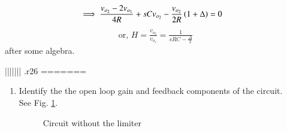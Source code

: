 \begin{enumerate}[label=\arabic*.,ref=\theenumi]
\begin{align}
\implies \frac{v_{o_2} - 2v_{o_1}}{4R} + sCv_{o_2} -  \frac{v_{o_2}}{2R}\left(1 + \Delta\right) &= 0
\end{align}
\begin{align}
\text{or, }    H = \frac{v_{o_2}}{v_{o_1}}= \frac{1}{sRC - \frac{\Delta}{2}}
    \label{eq:es17btech11009_H}
\end{align}
after some algebra.
%

||||||| .r26
=======
\begin{enumerate}[label=\arabic*.,ref=\theenumi]
\item Identify the the open loop gain and feedback  components of the circuit.
\\
\solution See Fig. \ref{fig:es17btech11009_b4}.
\begin{figure}[!ht]
	\begin{center}
		\resizebox{\columnwidth}{!}{}
	\end{center}
\caption{Circuit without the limiter}
\label{fig:es17btech11009_b4}
\end{figure}


\end{enumerate}
\end{enumerate}
